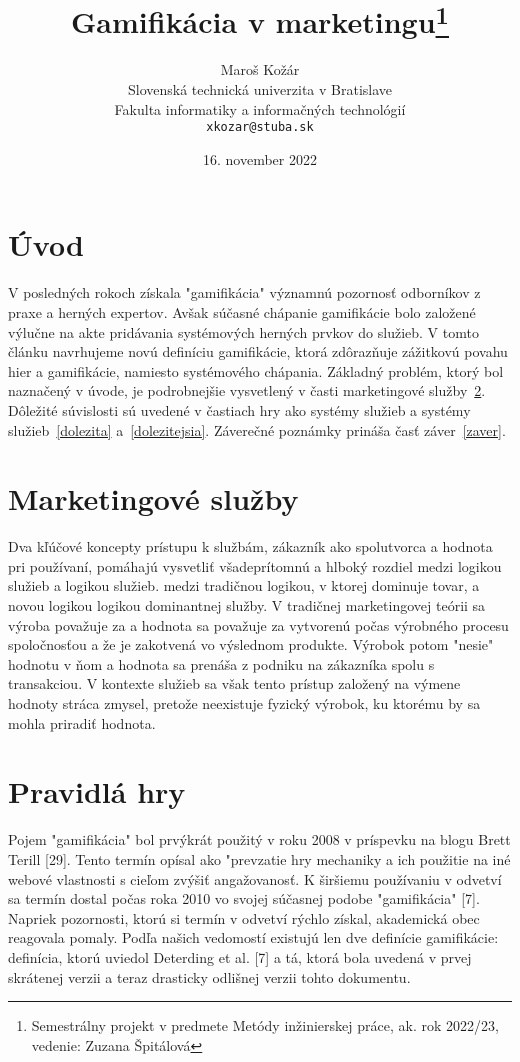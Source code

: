 \documentclass[10pt,twoside,slovak,a4paper]{article}
\title{Gamifikácia v marketingu\thanks{Semestrálny projekt v predmete Metódy inžinierskej práce, ak. rok 2022/23, vedenie: Zuzana Špitálová}}
\author{Maroš Kožár\\[2pt]
	{\small Slovenská technická univerzita v Bratislave}\\
	{\small Fakulta informatiky a informačných technológií}\\
	{\small \texttt{xkozar@stuba.sk}}
	}
\date{\small 16. november 2022}
\begin{document}
\maketitle
\section{Úvod}
V posledných rokoch získala "gamifikácia" významnú pozornosť odborníkov z praxe a herných expertov.
Avšak súčasné chápanie gamifikácie bolo založené výlučne na akte pridávania systémových herných prvkov do služieb.
V tomto článku navrhujeme novú definíciu gamifikácie, ktorá zdôrazňuje zážitkovú povahu hier a gamifikácie, namiesto systémového chápania.
Základný problém, ktorý bol naznačený v úvode, je podrobnejšie vysvetlený v časti marketingové služby~\ref{nejaka}.
Dôležité súvislosti sú uvedené v častiach hry ako systémy služieb a systémy služieb~\ref{dolezita} a~\ref{dolezitejsia}.
Záverečné poznámky prináša časť záver~\ref{zaver}.



\section{Marketingové služby} \label{nejaka}


\begin{figure*}[tbh]
Dva kľúčové koncepty prístupu k službám, zákazník ako spolutvorca a hodnota pri používaní, pomáhajú vysvetliť všadeprítomnú
a hlboký rozdiel medzi logikou služieb a logikou služieb.
medzi tradičnou logikou, v ktorej dominuje tovar, a novou logikou
logikou dominantnej služby.
V tradičnej marketingovej teórii sa výroba považuje za
a hodnota sa považuje za vytvorenú
počas výrobného procesu spoločnosťou a že je
zakotvená vo výslednom produkte. Výrobok potom "nesie"
hodnotu v ňom a hodnota sa prenáša z podniku na
zákazníka spolu s transakciou. V kontexte služieb sa však tento
prístup založený na výmene hodnoty stráca zmysel, pretože neexistuje
fyzický výrobok, ku ktorému by sa mohla priradiť hodnota.
\end{figure*}



\section{Pravidlá hry} \label{ina}

Pojem "gamifikácia" bol prvýkrát použitý v roku 2008 v príspevku na blogu
Brett Terill [29]. Tento termín opísal ako "prevzatie hry
mechaniky a ich použitie na iné webové vlastnosti s cieľom zvýšiť
angažovanosť. K širšiemu používaniu v odvetví sa termín dostal
počas roka 2010 vo svojej súčasnej podobe "gamifikácia" [7].
Napriek pozornosti, ktorú si termín v odvetví rýchlo získal,
akademická obec reagovala pomaly. Podľa našich vedomostí existujú
len dve definície gamifikácie: definícia, ktorú uviedol Deterding
et al. [7] a tá, ktorá bola uvedená v prvej skrátenej verzii a teraz
drasticky odlišnej verzii tohto dokumentu. 
\end{document}
